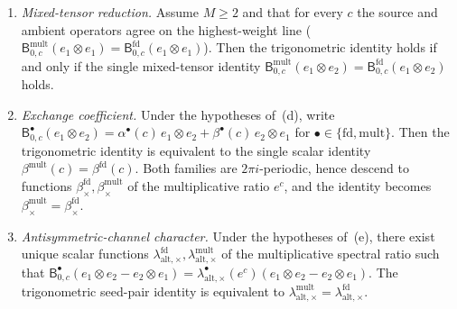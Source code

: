\begin{theorem}
\begin{enumerate}[label=\textup{(\alph*)}]
\item\emph{Mixed-tensor reduction.}
  Assume \(M\ge 2\) and that for every \(c\) the source and ambient
  operators agree on the highest-weight line
  (\(\mathsf B_{0,c}^{\mathrm{mult}}(e_1\otimes e_1)
  = \mathsf B_{0,c}^{\mathrm{fd}}(e_1\otimes e_1)\)).
  Then the trigonometric identity holds if and only if the single
  mixed-tensor identity
  \(\mathsf B_{0,c}^{\mathrm{mult}}(e_1\otimes e_2)
  = \mathsf B_{0,c}^{\mathrm{fd}}(e_1\otimes e_2)\) holds.

\item\emph{Exchange coefficient.}
  Under the hypotheses of~\textup{(d)}, write
  \(\mathsf B_{0,c}^{\bullet}(e_1\otimes e_2)
  = \alpha^{\bullet}(c)\,e_1\otimes e_2
  + \beta^{\bullet}(c)\,e_2\otimes e_1\)
  for \(\bullet\in\{\mathrm{fd},\mathrm{mult}\}\).
  Then the trigonometric identity is equivalent to the single scalar
  identity \(\beta^{\mathrm{mult}}(c)=\beta^{\mathrm{fd}}(c)\).
  Both families are \(2\pi i\)-periodic, hence descend to functions
  \(\beta_\times^{\mathrm{fd}},\beta_\times^{\mathrm{mult}}\) of the
  multiplicative ratio \(e^c\), and the identity becomes
  \(\beta_\times^{\mathrm{mult}}=\beta_\times^{\mathrm{fd}}\).

\item\emph{Antisymmetric-channel character.}
  Under the hypotheses of~\textup{(e)}, there exist unique scalar
  functions
  \(\lambda_{\mathrm{alt},\times}^{\mathrm{fd}},
  \lambda_{\mathrm{alt},\times}^{\mathrm{mult}}\) of the
  multiplicative spectral ratio such that
  \(\mathsf B_{0,c}^{\bullet}(e_1\otimes e_2-e_2\otimes e_1)
  = \lambda_{\mathrm{alt},\times}^{\bullet}(e^c)
  (e_1\otimes e_2-e_2\otimes e_1)\).
  The trigonometric seed-pair identity is equivalent to
  \(\lambda_{\mathrm{alt},\times}^{\mathrm{mult}}
  = \lambda_{\mathrm{alt},\times}^{\mathrm{fd}}\).
\end{enumerate}
\end{theorem}

